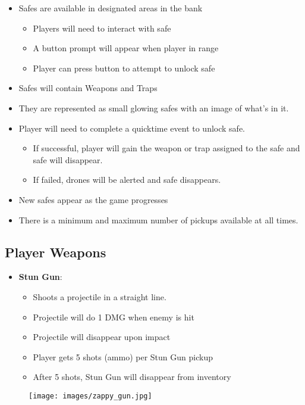 \documentclass[10pt]{report}
\begin{document}
\begin{itemize}
    \item Safes are available in designated areas in the bank
    \begin{itemize}
        \item Players will need to interact with safe
        \item A button prompt will appear when player in range
        \item Player can press button to attempt to unlock safe
    \end{itemize}
    \item Safes will contain Weapons and Traps
    \item They are represented as small glowing safes with an image of what’s in it.
    \item Player will need to complete a quicktime event to unlock safe.
    \begin{itemize}
        \item If successful, player will gain the weapon or trap assigned to the safe and safe will disappear.
        \item If failed, drones will be alerted and safe disappears.
    \end{itemize}
    \item New safes appear as the game progresses
    \item There is a minimum and maximum number of pickups available at all times.    
\end{itemize}

\subsection{Player Weapons}

\begin{minipage}{.8\linewidth}
    \begin{itemize}
        \item \textbf{Stun Gun}:
        \begin{itemize}
            \item Shoots a projectile in a straight line.
            \item Projectile will do 1 DMG when enemy is hit 
            \item Projectile will disappear upon impact
            \item Player gets 5 shots (ammo) per Stun Gun pickup
            \item After 5 shots, Stun Gun will disappear from inventory
        \end{itemize}
    \end{itemize}
\end{minipage} \hfill
\begin{minipage}{.18\linewidth}
    \begin{figure}[H]
        \centering
        \texttt{[image: images/zappy\_gun.jpg]}
        \caption{}
    \end{figure}
\end{minipage}
\end{document}
